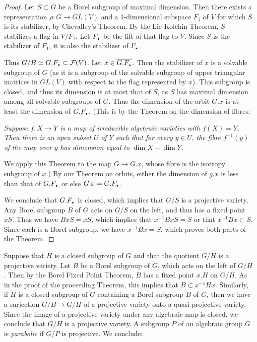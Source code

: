\documentclass[12pt]{amsart}
\newcommand{\DOT}{{\mbox{\Large\bf .}}}
\begin{document}
\begin{proof}
Let $S\subset G$ be a Borel subgroup of maximal dimension.
Then there exists a representation $\rho:G\to GL(V)$ and a 1-dimensional
subspace $F_1$ of $V$ for which $S$ is its stabilizer, by Chevalley's
Theorem. 
By the Lie-Kolchin Theorem, $S$ stabilizes a flag in $V/F_1$.
Let $F_{\DOT}$ be the lift of that flag to $V$.
Since $S$ is the stabilizer of $F_1$,
it is also the stabilizer of $F\!_{\DOT}$.

Thus $G/B\simeq G.F_{\DOT}\subset {\mathcal F}(V)$.
Let $x\in \overline{G.F_{\DOT}}$.
Then the stabilizer of $x$ is a solvable subgroup of
$G$ (as it is a subgroup of the solvable subgroup of upper triangular
matrices in $GL(V)$ with respect to the flag represented by $x$).
This subgroup is closed, and thus its dimension is at most that of $S$, as
$S$ has maximal dimension among all solvable subgroups of $G$.
Thus the dimension of the orbit $G.x$ is at least the dimension of 
$G.F\!_{\DOT}$.
(This is by the Theorem on the dimension of fibres:
\medskip

{\it 
Suppose $f:X\to Y$ is a map of irreducible algebraic varieties with
$f(X)=Y$. 
Then there is an open subset $U$ of $Y$ such that for every $y\in U$, the
fibre $f^{-1}(y)$ of the map over $y$ has  dimension equal to
$\dim X - \dim Y$.
}\medskip

We apply this Theorem to the map $G\to G.x$, whose fibre is the isotropy
subgroup of $x$.)
By our Theorem on orbits, either the dimension of $g.x$ is less than
that of $G.F_{\DOT}$ or else $G.x=G.F_{\DOT}$.

We conclude that $G.F_{\DOT}$ is closed, which implies that $G/S$ is a
projective variety.
Any Borel subgroup $B$ of $G$ acts on $G/S$ on the left, and thus has a
fixed point $xS$.
Thus we have $BxS=xS$, which implies that $x^{-1}BxS=S$ or that 
$x^{-1}Bx\subset S$.
Since each is a Borel subgroup, we have $x^{-1}Bx=S$, which proves both
parts of the Theorem.
\end{proof}


Suppose that $H$ is a closed subgroup of $G$ and that the quotient $G/H$ is
a projective variety.
Let $B$ be a Borel subgroup of $G$, which acts on the left of $G/H$.
Then by the Borel Fixed Point Theorem, $B$ has a fixed point $x.H$ on $G/H$. 
As in the proof of the proceeding Theorem, this implies that 
$B\subset x^{-1}Hx$.
Similarly, if $H$ is a closed subgroup of $G$ containing a Borel subgroup
$B$ of $G$, then we have a surjection $G/B\to G/H$ of a projective variety
onto a quasi-projective variety.
Since the image of a projective variety under any algebraic map is closed,
we conclude that $G/H$ is a projective variety.
A subgroup $P$ of an algebraic group $G$ is {\sl parabolic} if $G/P$ is
projective.  
We conclude:
\medskip
\end{document}
